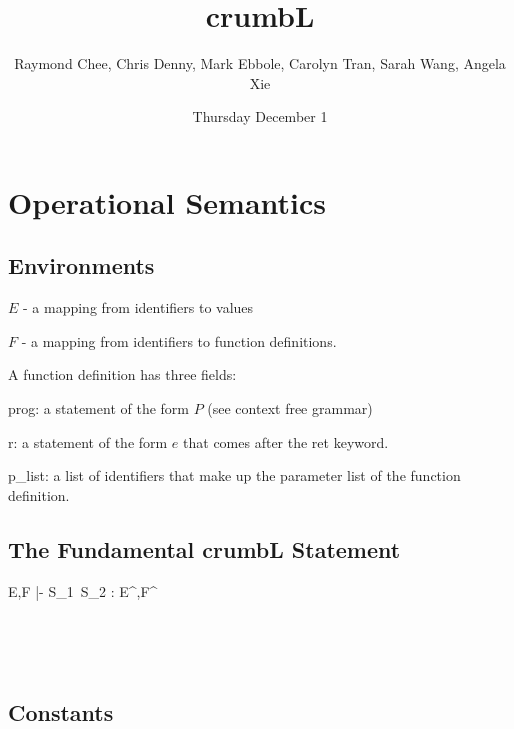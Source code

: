 \documentclass[12pt,letterpaper]{article}
\title{crumbL}
\author{Raymond Chee, Chris Denny, Mark Ebbole, Carolyn Tran, Sarah Wang, Angela Xie}
\date{Thursday December 1}
\begin{document}



\section{Operational Semantics}

\subsection{Environments}

$E$ - a mapping from identifiers to values

$F$ - a mapping from identifiers to function definitions. 

A function definition has three fields: 

prog: a statement of the form $P$ (see context free grammar)

r: a statement of the form $e$ that comes after the ret keyword.

p\_list: a list of identifiers that make up the parameter list of the function definition.


\subsection{The Fundamental crumbL Statement}
		  {E,F |- S_1\ S_2 : E^{\prime\prime},F^{\prime\prime}}

\ 

\ 


\subsection{Constants}




\



\ 

\end{document}

